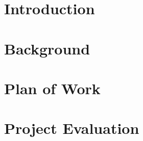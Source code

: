 \documentclass[12pt,a4paper]{report}
\begin{document}
\tableofcontents %
\newpage

\listoftables
\newpage

\listoffigures
\newpage


\newcommand{\software}{\textit{Alias}}

\chapter{Introduction}


\chapter{Background}
 

\chapter{Plan of Work}


\chapter{Project Evaluation}





\newpage


\end{document}
